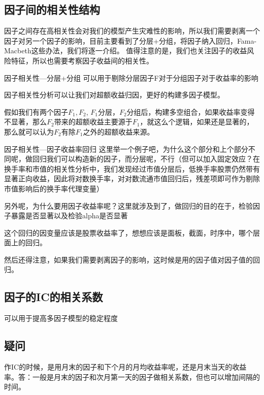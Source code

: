 \documentclass[12pt]{article}
\begin{document}
\subsection{因子间的相关性结构}
因子之间存在高相关性会对我们的模型产生灾难性的影响，所以我们需要剥离一个因子对另一个因子的影响，目前主要看到了分层+分组，将因子纳入回归，Fama-Macbeth这些办法，我们将逐一介绍。
值得注意的是，我们也关注因子的收益风险特征，所以也需要考察因子收益间的相关性。
\begin{sdefinition}{因子相关性—分层+分组}{}
可以用于剔除分层因子F对于分组因子对于收益率的影响
\end{sdefinition}
因子相关性分析可以让我们对超额收益归因，更好的构建多因子模型。
\begin{sremark}{}{}
假如我们有两个因子$F_1,F_2$, $F_1$分层，$F_2$分组后，构建多空组合，如果收益率变得不显著，那么$F_2$带来的超额收益主要源于$F_1$，就这么个逻辑，如果还是显著的，那么就可以认为$F_2$有除$F_1$之外的超额收益来源。
\end{sremark}



\begin{sdefinition}{因子相关性—因子收益率回归}{}
这里举一个例子吧，为什么这个部分和上个部分不同呢，做回归我们可以构造新的因子，而分层呢，不行（但可以加入固定效应？在换手率和市值的相关性分析中，我们发现经过市值分层后，低换手率股票仍然带有显著正向收益，因此将对数换手率，对对数流通市值回归后，残差项即可作为剔除市值影响后的换手率代理变量）
\end{sdefinition}
另外呢，为什么要用因子收益率呢？这里就涉及到了，做回归的目的在于，检验因子暴露是否显著以及检验alpha是否显著
\begin{sremark}{}{}
这个回归的因变量应该是股票收益率了，想想应该是面板，截面，时序中，哪个层面上的回归。
\end{sremark}
\begin{sremark}{}{}
然后还得注意，如果我们需要剥离因子的影响，这时候是用的因子值对因子值的回归。
\end{sremark}

\subsection{因子的IC的相关系数}
可以用于提高多因子模型的稳定程度 
\subsection{疑问}
作IC的时候，是用月末的因子和下个月的月均收益率呢，还是月末当天的收益率。答：一般是月末的因子和次月第一天的因子做相关系数，但也可以增加间隔的时间。
\end{document}
